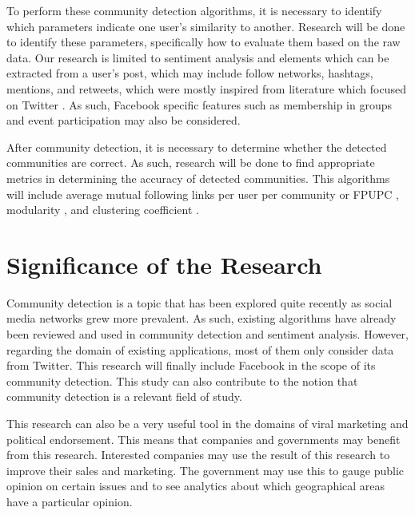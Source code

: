 To perform these community detection algorithms, it is necessary to identify which parameters indicate one user’s similarity to another. Research will be done to identify these parameters, specifically how to evaluate them based on the raw data. Our research is limited to sentiment analysis and elements which can be extracted from a user’s post, which may include follow networks, hashtags, mentions, and retweets, which were mostly inspired from literature which focused on Twitter \cite{Deitrick:2013,Zhang:2012,Lim:2012:1}. As such, Facebook specific features such as membership in groups and event participation may also be considered.

After community detection, it is necessary to determine whether the detected communities are correct. As such, research will be done to find appropriate metrics in determining the accuracy of detected communities. This algorithms will include average mutual following links per user per community or FPUPC \cite{Zhang:2012}, modularity \cite{Deitrick:2013},  and clustering coefficient \cite{Lim:2012:1}.

\section{Significance of the Research}
\label{sec:significance}

Community detection is a topic that has been explored quite recently as social media networks grew more prevalent. As such, existing algorithms have already been reviewed and used in community detection and sentiment analysis. However, regarding the domain of existing applications, most of them only consider data from Twitter. This research will finally include Facebook in the scope of its community detection. This study can also contribute to the notion that community detection is a relevant field of study.

This research can also be a very useful tool in the domains of viral marketing and political endorsement. This means that companies and governments may benefit from this research. Interested companies may use the result of this research to improve their sales and marketing. The government may use this to gauge public opinion on certain issues and to see analytics about which geographical areas have a particular opinion. 